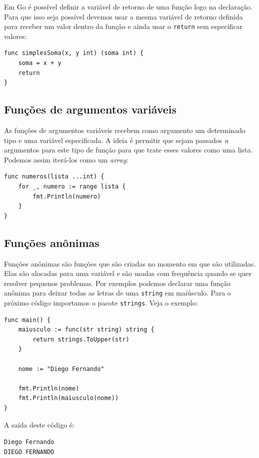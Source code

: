 \documentclass{SBCbookchapter}
\begin{document}
Em Go é possível definir a variável de retorno de uma função logo na declaração. Para que isso seja possível devemos usar a mesma variável de retorno definida para receber um valor dentro da função e ainda usar o \texttt{return} sem especificar valores:

\begin{lstlisting}
func simplesSoma(x, y int) (soma int) {
	soma = x + y
	return
}
\end{lstlisting}

\subsection{Funções de argumentos variáveis}

As funções de argumentos variáveis recebem como argumento um determinado tipo e uma variável especificada. A ideia é permitir que sejam passados \textit{n} argumentos para este tipo de função para que trate esses valores como uma lista. Podemos assim iterá-los como um \textit{array}:

\begin{lstlisting}
func numeros(lista ...int) {
	for _, numero := range lista {
		fmt.Println(numero)
	}
}
\end{lstlisting}

\subsection{Funções anônimas}

Funções anônimas são funções que são criadas no momento em que são utilizadas. Elas são alocadas para uma variável e são usadas com frequência quando se quer resolver pequenos problemas. Por exemplos podemos declarar uma função anônima para deixar todas as letras de uma \texttt{string} em maiúsculo. Para o próximo código importamos o pacote \texttt{strings}. Veja o exemplo:

\begin{lstlisting}
func main() {
	maiusculo := func(str string) string {
		return strings.ToUpper(str)
	}
	
	nome := "Diego Fernando"
	
	fmt.Println(nome)
	fmt.Println(maiusculo(nome))
}
\end{lstlisting}

A saída deste código é:

\noindent\texttt{Diego Fernando}\\
\texttt{DIEGO FERNANDO}\\
\end{document}
